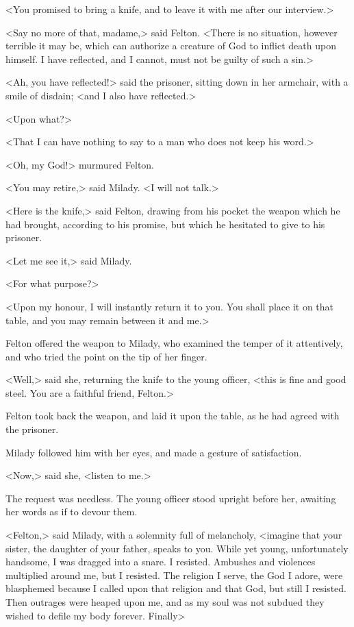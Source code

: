 <You promised to bring a knife, and to leave it with me after our interview.> 

<Say no more of that, madame,> said Felton. <There is no situation, however terrible it may be, which can authorize a creature of God to inflict death upon himself. I have reflected, and I cannot, must not be guilty of such a sin.> 

<Ah, you have reflected!> said the prisoner, sitting down in her armchair, with a smile of disdain; <and I also have reflected.> 

<Upon what?> 

<That I can have nothing to say to a man who does not keep his word.> 

<Oh, my God!> murmured Felton. 

<You may retire,> said Milady. <I will not talk.> 

<Here is the knife,> said Felton, drawing from his pocket the weapon which he had brought, according to his promise, but which he hesitated to give to his prisoner. 

<Let me see it,> said Milady. 

<For what purpose?> 

<Upon my honour, I will instantly return it to you. You shall place it on that table, and you may remain between it and me.> 

Felton offered the weapon to Milady, who examined the temper of it attentively, and who tried the point on the tip of her finger. 

<Well,> said she, returning the knife to the young officer, <this is fine and good steel. You are a faithful friend, Felton.> 

Felton took back the weapon, and laid it upon the table, as he had agreed with the prisoner. 

Milady followed him with her eyes, and made a gesture of satisfaction. 

<Now,> said she, <listen to me.> 

The request was needless. The young officer stood upright before her, awaiting her words as if to devour them. 

<Felton,> said Milady, with a solemnity full of melancholy, <imagine that your sister, the daughter of your father, speaks to you. While yet young, unfortunately handsome, I was dragged into a snare. I resisted. Ambushes and violences multiplied around me, but I resisted. The religion I serve, the God I adore, were blasphemed because I called upon that religion and that God, but still I resisted. Then outrages were heaped upon me, and as my soul was not subdued they wished to defile my body forever. Finally\longdash> 

